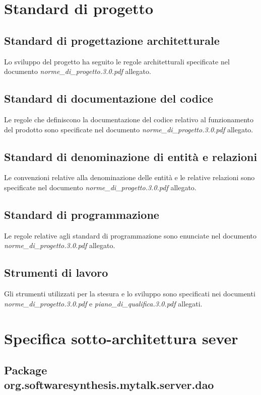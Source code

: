 \section{Standard di progetto}

\subsection{Standard di progettazione architetturale}
Lo sviluppo del progetto ha seguito le regole architetturali specificate nel documento  \textit{norme\_di\_progetto.3.0.pdf} allegato.

\subsection{Standard di documentazione del codice}
Le regole che definiscono la documentazione del codice relativo al funzionamento del prodotto sono specificate nel documento \textit{norme\_di\_progetto.3.0.pdf} allegato.

\subsection{Standard di denominazione di entità e relazioni}
Le convenzioni relative alla denominazione delle entità e le relative relazioni sono specificate nel documento \textit{norme\_di\_progetto.3.0.pdf} allegato.

\subsection{Standard di programmazione}
Le regole relative agli standard di programmazione sono enunciate nel documento \textit{norme\_di\_progetto.3.0.pdf} allegato.

\subsection{Strumenti di lavoro}
Gli strumenti utilizzati per la stesura e lo sviluppo sono specificati nei documenti \textit{norme\_di\_progetto.3.0.pdf} e \textit{piano\_di\_qualifica.3.0.pdf} allegati.

\clearpage

\section{Specifica sotto-architettura sever}\label{sec:serverarchitecture}

\subsection{Package org.softwaresynthesis.mytalk.server.dao}\label{sec:dao}

